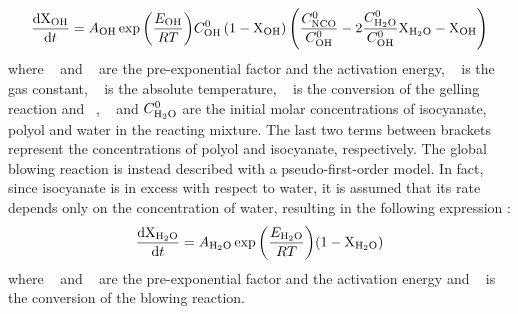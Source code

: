 \begin{equation}
     \frac{\mathrm{d}\mathrm{X}_{\mathrm{O}\mathrm{H}}}{\mathrm{d}t} =
     A_{\mathrm{O}\mathrm{H}}\exp{\left(\frac{\ensuremath{E_{\mathrm{O}\mathrm{H}}}}{\ensuremath{R}T}\right)}
     C^0_{\mathrm{O}\mathrm{H}}
     \left( 1-\mathrm{X}_{\mathrm{O}\mathrm{H}} \right)
     \left(
         \frac{ C^0_{\mathrm{N}\mathrm{C}\mathrm{O}} }{ C^0_{\mathrm{O}\mathrm{H}} } -
         2 \frac{ C^0_{\mathrm{H}_2\mathrm{O}} }{ C^0_{\mathrm{O}\mathrm{H}} } \mathrm{X}_{\mathrm{H}_2\mathrm{O}} -
         \mathrm{X}_{\mathrm{O}\mathrm{H}}
     \right)
\end{equation}
where {~\ArrheniusPreexponentialFactor{\Hydroxyl} } and {~\ArrheniusActivationEnergy{\Hydroxyl} } are the pre-exponential factor and the activation energy, {~\GasConstant} is the gas constant, {~\Temperature} is the absolute temperature, {~\ConversionHydroxyl} is the conversion of the gelling reaction and {~\ConcentrationInitialCyanate}, {~\ConcentrationInitialHydroxyl} and $C^0_{\mathrm{H}_2\mathrm{O}}$ are the initial molar concentrations of isocyanate, polyol and water in the reacting mixture. 
The last two terms between brackets represent the concentrations of polyol and isocyanate, respectively. 
The global blowing reaction is instead described with a pseudo-first-order model. In fact, since isocyanate is in excess with respect to water, it is assumed that its rate depends only on the concentration of water, resulting in the following expression \cite{winkler_1993,baser_and_khakhar_1994_a,baser_and_khakhar_1994_b,greier_and_piesche_etal_2009}:
\begin{equation}
        \frac{\mathrm{d}\mathrm{X}_{\mathrm{H}_2\mathrm{O}}}{\mathrm{d}t} = A_{\mathrm{H}_2\mathrm{O}}\exp{\left(\frac{\ensuremath{E_{\mathrm{H}_2\mathrm{O}}}}{\ensuremath{R}T}\right)} ( 1 - \mathrm{X}_{\mathrm{H}_2\mathrm{O}})
\end{equation}
where {~\ArrheniusPreexponentialFactor{\Water} } and {~\ArrheniusActivationEnergy{\Water} } are the pre-exponential factor and the activation energy and {~\ConversionWater} is the conversion of the blowing reaction.

